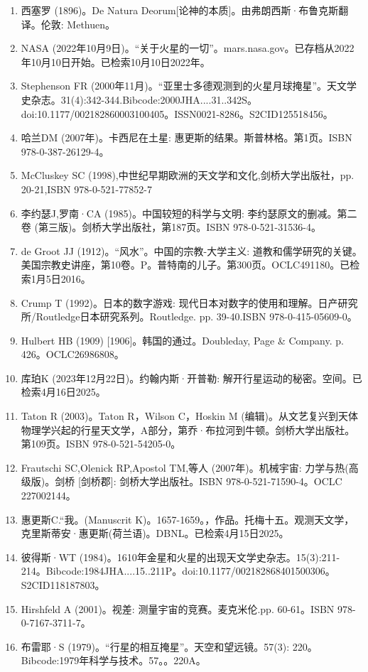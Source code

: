 \begin{enumerate}
\item 西塞罗 (1896)。De Natura Deorum[论神的本质]。由弗朗西斯·布鲁克斯翻译。伦敦: Methuen。
\item NASA (2022年10月9日)。“关于火星的一切”。mars.nasa.gov。已存档从2022年10月10日开始。已检索10月10日2022年。
\item Stephenson FR (2000年11月)。“亚里士多德观测到的火星月球掩星”。天文学史杂志。31(4):342-344.Bibcode:2000JHA....31..342S。doi:10.1177/002182860003100405。ISSN0021-8286。S2CID125518456。  
\item 哈兰DM (2007年)。卡西尼在土星: 惠更斯的结果。斯普林格。第1页。ISBN 978-0-387-26129-4。
\item McCluskey SC (1998),中世纪早期欧洲的天文学和文化,剑桥大学出版社，pp. 20-21,ISBN 978-0-521-77852-7
\item 李约瑟J,罗南·CA (1985)。中国较短的科学与文明: 李约瑟原文的删减。第二卷 (第三版)。剑桥大学出版社，第187页。ISBN 978-0-521-31536-4。
\item de Groot JJ (1912)。“风水”。中国的宗教-大学主义: 道教和儒学研究的关键。美国宗教史讲座，第10卷。P。普特南的儿子。第300页。OCLC491180。已检索1月5日2016。 
\item Crump T (1992)。日本的数字游戏: 现代日本对数字的使用和理解。日产研究所/Routledge日本研究系列。Routledge. pp. 39-40.ISBN 978-0-415-05609-0。
\item Hulbert HB (1909) [1906]。韩国的通过。Doubleday, Page & Company. p. 426。OCLC26986808。 
\item 库珀K (2023年12月22日)。约翰内斯·开普勒: 解开行星运动的秘密。空间。已检索4月16日2025。
\item Taton R (2003)。Taton R，Wilson C，Hoskin M (编辑)。从文艺复兴到天体物理学兴起的行星天文学，A部分，第乔·布拉河到牛顿。剑桥大学出版社。第109页。ISBN 978-0-521-54205-0。
\item Frautschi SC,Olenick RP,Apostol TM,等人 (2007年)。机械宇宙: 力学与热(高级版)。剑桥 [剑桥郡]: 剑桥大学出版社。ISBN 978-0-521-71590-4。OCLC 227002144。
\item 惠更斯C.“我。(Manuscrit K)。1657-1659。，作品。托梅十五。观测天文学，克里斯蒂安·惠更斯(荷兰语)。DBNL。已检索4月15日2025。
\item 彼得斯·WT (1984)。1610年金星和火星的出现天文学史杂志。15(3):211-214。Bibcode:1984JHA....15..211P。doi:10.1177/002182868401500306。S2CID118187803。 
\item Hirshfeld A (2001)。视差: 测量宇宙的竞赛。麦克米伦.pp. 60-61。ISBN 978-0-7167-3711-7。
\item 布雷耶·S (1979)。“行星的相互掩星”。天空和望远镜。57(3): 220。Bibcode:1979年科学与技术。57。。220A。

\end{enumerate}

